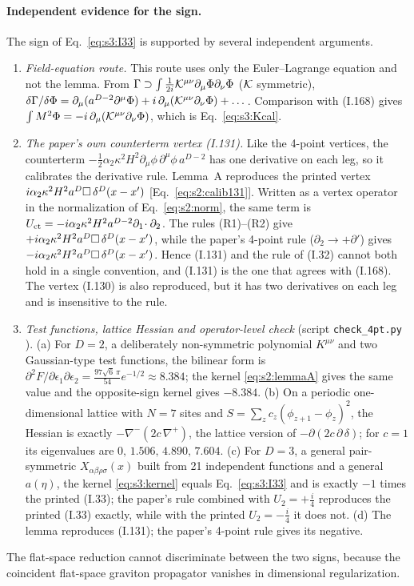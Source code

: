 \documentclass[aps,prd,onecolumn,10pt,nofootinbib,floatfix]{revtex4-2}
\newcommand{\eqI}[1]{(I.#1)}
\begin{document}
\paragraph*{Independent evidence for the sign.}
The sign of Eq.~\eqref{eq:s3:I33} is supported by several independent arguments.
\begin{enumerate}
\item \emph{Field-equation route.} This route uses only the Euler--Lagrange equation and not
the lemma. From $\Gamma\supset\int\frac1{2i}\mathcal K^{\mu\nu}\partial_\mu\Phi\partial_\nu\Phi$
($\mathcal K$ symmetric),
$\delta\Gamma/\delta\Phi=\partial_\mu(a^{D-2}\partial^\mu\Phi)+i\,\partial_\mu(\mathcal K^{\mu\nu}\partial_\nu\Phi)+\dots$.
Comparison with \eqI{168} gives $\int M^2\Phi=-i\,\partial_\mu(\mathcal K^{\mu\nu}\partial_\nu\Phi)$,
which is Eq.~\eqref{eq:s3:Kcal}.
\item \emph{The paper's own counterterm vertex \eqI{131}.} Like the 4-point vertices, the counterterm
$-\frac12\alpha_2\kappa^2H^2\partial_\mu\phi\,\partial^\mu\phi\,a^{D-2}$ has one derivative on each leg, so it
calibrates the derivative rule. Lemma~A reproduces the printed vertex
$i\alpha_2\kappa^2H^2a^D\square\,\delta^D(x-x')$ [Eq.~\eqref{eq:s2:calib131}]. Written as a vertex operator in the
normalization of Eq.~\eqref{eq:s2:norm}, the same term is
$U_{\rm ct}=-i\alpha_2\kappa^2H^2a^{D-2}\partial_1\!\cdot\partial_2$. The rules (R1)--(R2) give
$+i\alpha_2\kappa^2H^2a^D\square\,\delta^D(x-x')$, while the paper's 4-point rule
($\partial_2\to+\partial'$) gives $-i\alpha_2\kappa^2H^2a^D\square\,\delta^D(x-x')$. Hence \eqI{131} and
the rule of \eqI{32} cannot both hold in a single convention, and \eqI{131} is the one that
agrees with \eqI{168}. The vertex \eqI{130} is also reproduced, but it has two derivatives on
each leg and is insensitive to the rule.
\item \emph{Test functions, lattice Hessian and operator-level check} (script
\mbox{\nolinkurl{check_4pt.py}} \cite{ref:repo}). (a) For $D=2$, a deliberately non-symmetric
polynomial $K^{\mu\nu}$ and two Gaussian-type test functions, the bilinear form is
$\partial^2F/\partial\epsilon_1\partial\epsilon_2=\frac{97\sqrt6\,\pi}{54}e^{-1/2}\approx8.384$;
the kernel \eqref{eq:s2:lemmaA} gives the same value and the opposite-sign kernel gives
$-8.384$. (b) On a periodic one-dimensional lattice with $N=7$ sites and
$S=\sum_zc_z(\phi_{z+1}-\phi_z)^2$, the Hessian is exactly $-\nabla^-(2c\,\nabla^+)$, the lattice
version of $-\partial(2c\,\partial\,\delta)$; for $c=1$ its eigenvalues are
$0,\,1.506,\,4.890,\,7.604$. (c) For $D=3$, a general pair-symmetric $X_{\alpha\beta\rho\sigma}(x)$
built from 21 independent functions and a general $a(\eta)$, the kernel
\eqref{eq:s3:kernel} equals Eq.~\eqref{eq:s3:I33} and is exactly $-1$ times the printed \eqI{33};
the paper's rule combined with $U_2=+\frac i4$ reproduces the printed \eqI{33} exactly, while
with the printed $U_2=-\frac i4$ it does not. (d) The lemma reproduces \eqI{131}; the paper's
4-point rule gives its negative.
\end{enumerate}
The flat-space reduction cannot discriminate between the two signs, because the coincident
flat-space graviton propagator vanishes in dimensional regularization.
\end{document}
